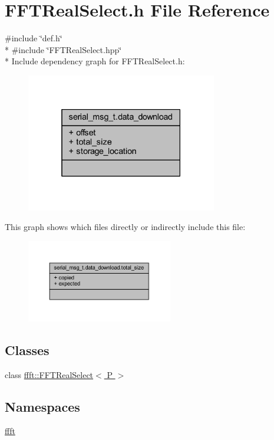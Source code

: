 \hypertarget{a00104}{\section{F\+F\+T\+Real\+Select.\+h File Reference}
\label{a00104}
}
{\ttfamily \#include \char`\"{}def.\+h\char`\"{}}\\*
{\ttfamily \#include \char`\"{}F\+F\+T\+Real\+Select.\+hpp\char`\"{}}\\*
Include dependency graph for F\+F\+T\+Real\+Select.\+h\+:
\nopagebreak
\begin{figure}[H]
\begin{center}
\leavevmode
\includegraphics[width=236pt]{dd/d86/a00271}
\end{center}
\end{figure}
This graph shows which files directly or indirectly include this file\+:
\nopagebreak
\begin{figure}[H]
\begin{center}
\leavevmode
\includegraphics[width=181pt]{d9/dd6/a00272}
\end{center}
\end{figure}
\subsection*{Classes}
\begin{DoxyCompactItemize}
\item 
class \hyperlink{a00015}{ffft\+::\+F\+F\+T\+Real\+Select$<$ P $>$}
\end{DoxyCompactItemize}
\subsection*{Namespaces}
\begin{DoxyCompactItemize}
\item 
 \hyperlink{a00142}{ffft}
\end{DoxyCompactItemize}
